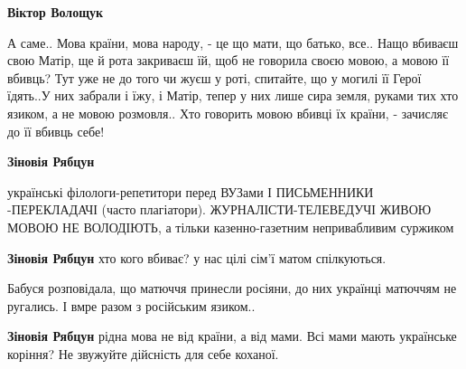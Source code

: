 \begin{itemize}
\begin{itemize}
\begin{itemize}
\textbf{Віктор Волощук} 

А саме.. Мова країни, мова народу, - це що мати, що батько, все.. Нащо вбиваєш
свою Матір, ще й рота закриваєш їй, щоб не говорила своєю мовою, а мовою її
вбивць? Тут уже не до того чи жуєш у роті, спитайте, що у могилі її Герої
їдять..У них забрали і їжу, і Матір, тепер у них лише сира земля, руками тих
хто язиком, а не мовою розмовля.. Хто говорить мовою вбивці їх країни, -
зачисляє до її вбивць себе!


 
\textbf{Зіновія Рябцун} 

українські філологи-репетитори перед ВУЗами І ПИСЬМЕННИКИ -ПЕРЕКЛАДАЧІ (часто
плагіатори). ЖУРНАЛІСТИ-ТЕЛЕВЕДУЧІ ЖИВОЮ МОВОЮ НЕ ВОЛОДІЮТЬ, а тільки
казенно-газетним непривабливим суржиком 🙁


 
\textbf{Зіновія Рябцун} хто кого вбиває? у нас цілі сім'ї матом спілкуються. \Smiley[1.0][yellow]

 
Бабуся розповідала, що матюччя принесли росіяни, до них українці матюччям не ругались. І вмре разом з російським язиком..

 
\textbf{Зіновія Рябцун} рідна мова не від країни, а від мами. Всі мами мають
українське коріння? Не звужуйте дійсність для себе коханої.

 

\end{itemize}
\end{itemize}
\end{itemize}
